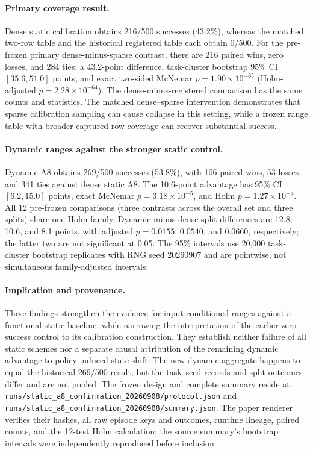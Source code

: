 \paragraph{Primary coverage result.}
Dense static calibration obtains 216/500 successes (43.2\%), whereas the matched two-row table and the historical registered table each obtain 0/500. For the pre-frozen primary dense-minus-sparse contrast, there are 216 paired wins, zero losses, and 284 ties: a 43.2-point difference, task-cluster bootstrap 95\% CI $[35.6,51.0]$ points, and exact two-sided McNemar $p=1.90\times10^{-65}$ (Holm-adjusted $p=2.28\times10^{-64}$). The dense-minus-registered comparison has the same counts and statistics. The matched dense--sparse intervention demonstrates that sparse calibration sampling can cause collapse in this setting, while a frozen range table with broader captured-row coverage can recover substantial success.

\paragraph{Dynamic ranges against the stronger static control.}
Dynamic A8 obtains 269/500 successes (53.8\%), with 106 paired wins, 53 losses, and 341 ties against dense static A8. The 10.6-point advantage has 95\% CI $[6.2,15.0]$ points, exact McNemar $p=3.18\times10^{-5}$, and Holm $p=1.27\times10^{-4}$. All 12 pre-frozen comparisons (three contrasts across the overall set and three splits) share one Holm family. Dynamic-minus-dense split differences are 12.8, 10.6, and 8.1 points, with adjusted $p=0.0155$, $0.0540$, and $0.0660$, respectively; the latter two are not significant at 0.05. The 95\% intervals use 20,000 task-cluster bootstrap replicates with RNG seed 20260907 and are pointwise, not simultaneous family-adjusted intervals.

\paragraph{Implication and provenance.}
These findings strengthen the evidence for input-conditioned ranges against a functional static baseline, while narrowing the interpretation of the earlier zero-success control to its calibration construction. They establish neither failure of all static schemes nor a separate causal attribution of the remaining dynamic advantage to policy-induced state shift. The new dynamic aggregate happens to equal the historical 269/500 result, but the task--seed records and split outcomes differ and are not pooled. The frozen design and complete summary reside at \nolinkurl{runs/static_a8_confirmation_20260908/protocol.json} and \nolinkurl{runs/static_a8_confirmation_20260908/summary.json}. The paper renderer verifies their hashes, all raw episode keys and outcomes, runtime lineage, paired counts, and the 12-test Holm calculation; the source summary's bootstrap intervals were independently reproduced before inclusion.

